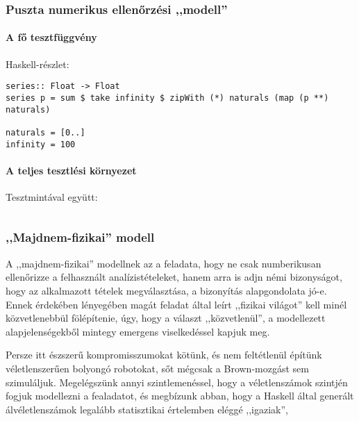 \documentclass{article}
\begin{document}
	\subsubsection{Puszta numerikus ellenőrzési ,,modell''}

	\paragraph{A fő tesztfüggvény} Haskell-részlet:


	\begin{verbatim}
series:: Float -> Float
series p = sum $ take infinity $ zipWith (*) naturals (map (p **) naturals)

naturals = [0..]
infinity = 100
	\end{verbatim}

	\paragraph{A teljes tesztlési környezet} Tesztmintával együtt:

	\inputminted{haskell}{Series.hs}

	\subsubsection{,,Majdnem-fizikai'' modell}

	A ,,majdnem-fizikai'' modellnek az a feladata, hogy ne csak numberikusan ellenőrizze a felhasznált analízistételeket,
	hanem arra is adjn némi bizonyságot, hogy az alkalmazott tételek megválasztása, a bizonyítás alapgondolata jó-e.
	Ennek érdekében lényegében magát  feladat által leírt ,,fizikai világot'' kell minél közvetlenebbül fölépítenie,
	úgy, hogy a választ ,,közvetlenül'', a modellezett alapjelenségekből mintegy emergens viselkedéssel kapjuk  meg.

	Persze itt észszerű kompromisszumokat kötünk, és nem feltétlenül építünk véletlenszerűen bolyongó robotokat, sőt mégcsak a Brown-mozgást sem szimuláljuk.
	Megelégszünk annyi szintlemenéssel, hogy a véletlenszámok szintjén fogjuk modellezni a fealadatot, és megbízunk abban, hogy a Haskell által generált álvéletlenszámok legalább statisztikai értelemben eléggé ,,igaziak'',
\end{document}
